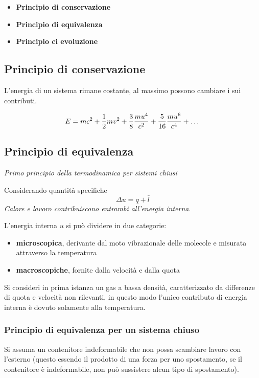 \begin{adjustwidth}{2in}{}
	\begin{itemize}
		\item \textbf{Principio di conservazione}
		\item \textbf{Principio di equivalenza}
		\item \textbf{Principio ci evoluzione}
	\end{itemize}
	
	\subsection{Principio di conservazione}
	\begin{en}
		L'energia di un sistema rimane costante, al massimo possono cambiare i sui contributi.
	\end{en}
	\[E=mc^2 + {1\over2}mv^2 + {3\over8}\dfrac{mu^4}{c^2} + {5\over16}\dfrac{mu^6}{c^4} + \dots\]
	 
	
	\subsection{Principio di equivalenza}
	\textit{Primo principio della termodinamica per sistemi chiusi}
	
	Considerando quantità specifiche 
	\begin{equation}\label{eq:1.2}
		\boxed{\Delta u = q+\bar{l}}
	\end{equation}
	\textit{Calore e lavoro contribuiscono entrambi all'energia interna}.
	
	L'energia interna $u$ si può dividere in due categorie:
	\begin{itemize}
		\item \textbf{microscopica}, derivante dal moto vibrazionale delle molecole e misurata attraverso la temperatura
		\item \textbf{macroscopiche}, fornite dalla velocità e dalla quota
	\end{itemize}
	Si consideri in prima istanza un gas a bassa densità, caratterizzato da differenze di quota e velocità non rilevanti, in questo modo l'unico contributo di energia interna è dovuto solamente alla temperatura.
	
	
	\subsubsection{Principio di equivalenza per un sistema chiuso}
	Si assuma un contenitore indeformabile che non possa scambiare lavoro con l'esterno (questo essendo il prodotto di una forza per uno spostamento, se il contenitore  è indeformabile, non può sussistere alcun tipo di spostamento).
	

\end{adjustwidth}

